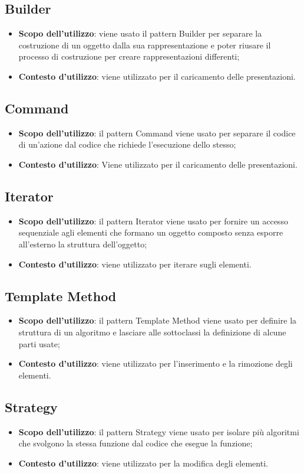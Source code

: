 {	\subsection{Builder}{
		\begin{itemize}
			\item \textbf{Scopo dell’utilizzo}: viene usato il pattern Builder per separare la costruzione di un oggetto dalla sua rappresentazione e poter riusare il processo di costruzione per creare rappresentazioni differenti;
			\item \textbf{Contesto d’utilizzo}: viene utilizzato per il caricamento delle presentazioni.
		\end{itemize}
	}
	\subsection{Command}{
		\begin{itemize}
			\item \textbf{Scopo dell’utilizzo}: il pattern Command viene usato per separare il codice di un’azione dal codice che richiede l’esecuzione dello stesso;
			\item \textbf{Contesto d’utilizzo}: Viene utilizzato per il caricamento delle presentazioni.
		\end{itemize}
	}
	\subsection{Iterator}{
		\begin{itemize}
			\item \textbf{Scopo dell’utilizzo}: il pattern Iterator viene usato per fornire un accesso sequenziale agli elementi che formano un oggetto composto senza esporre all’esterno la struttura dell’oggetto;
			\item \textbf{Contesto d’utilizzo}: viene utilizzato per iterare sugli elementi.
		\end{itemize}
	}
	\subsection{Template Method}{
		\begin{itemize}
			\item \textbf{Scopo dell’utilizzo}: il pattern Template Method viene usato per definire la struttura di un algoritmo e lasciare alle sottoclassi la definizione di alcune parti usate;
			\item \textbf{Contesto d’utilizzo}: viene utilizzato per l’inserimento e la rimozione degli elementi.
		\end{itemize}
	}
	\subsection{Strategy}{
		\begin{itemize}
			\item \textbf{Scopo dell’utilizzo}: il pattern Strategy viene usato per isolare più algoritmi che svolgono la stessa funzione dal codice che esegue la funzione;
			\item \textbf{Contesto d’utilizzo}: viene utilizzato per la modifica degli elementi.
		\end{itemize}
	}
}